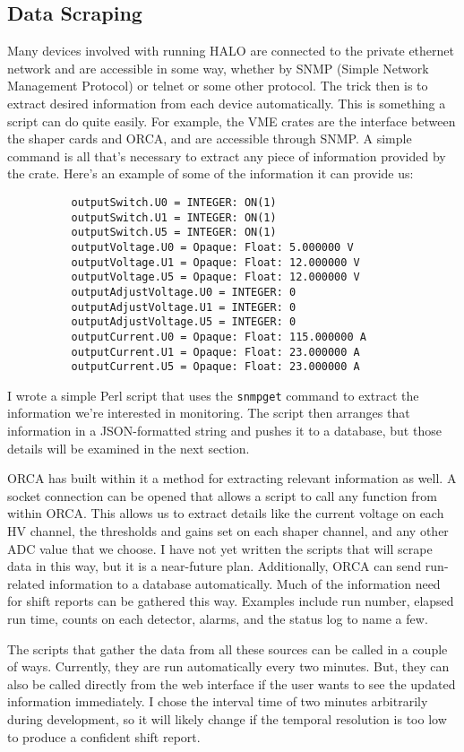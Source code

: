 		\subsection{Data Scraping}
		Many devices involved with running HALO are connected to the private ethernet network and are accessible in some way, whether by SNMP (Simple Network Management Protocol) or telnet or some other protocol. The trick then is to extract desired information from each device automatically. This is something a script can do quite easily. For example, the VME crates are the interface between the shaper cards and ORCA, and are accessible through SNMP. A simple command is all that's necessary to extract any piece of information provided by the crate. Here's an example of some of the information it can provide us:
		\begin{verbatim}
		  outputSwitch.U0 = INTEGER: ON(1)
		  outputSwitch.U1 = INTEGER: ON(1)
		  outputSwitch.U5 = INTEGER: ON(1)
		  outputVoltage.U0 = Opaque: Float: 5.000000 V
		  outputVoltage.U1 = Opaque: Float: 12.000000 V
		  outputVoltage.U5 = Opaque: Float: 12.000000 V
		  outputAdjustVoltage.U0 = INTEGER: 0
		  outputAdjustVoltage.U1 = INTEGER: 0
		  outputAdjustVoltage.U5 = INTEGER: 0
		  outputCurrent.U0 = Opaque: Float: 115.000000 A
		  outputCurrent.U1 = Opaque: Float: 23.000000 A
		  outputCurrent.U5 = Opaque: Float: 23.000000 A
		\end{verbatim}
		I wrote a simple Perl script that uses the \verb$snmpget$ command to extract the information we're interested in monitoring. The script then arranges that information in a JSON-formatted string and pushes it to a database, but those details will be examined in the next section.

		ORCA has built within it a method for extracting relevant information as well. A socket connection can be opened that allows a script to call any function from within ORCA. This allows us to extract details like the current voltage on each HV channel, the thresholds and gains set on each shaper channel, and any other ADC value that we choose. I have not yet written the scripts that will scrape data in this way, but it is a near-future plan. Additionally, ORCA can send run-related information to a database automatically. Much of the information need for shift reports can be gathered this way. Examples include run number, elapsed run time, counts on each detector, alarms, and the status log to name a few.

		The scripts that gather the data from all these sources can be called in a couple of ways. Currently, they are run automatically every two minutes. But, they can also be called directly from the web interface if the user wants to see the updated information immediately. I chose the interval time of two minutes arbitrarily during development, so it will likely change if the temporal resolution is too low to produce a confident shift report.

